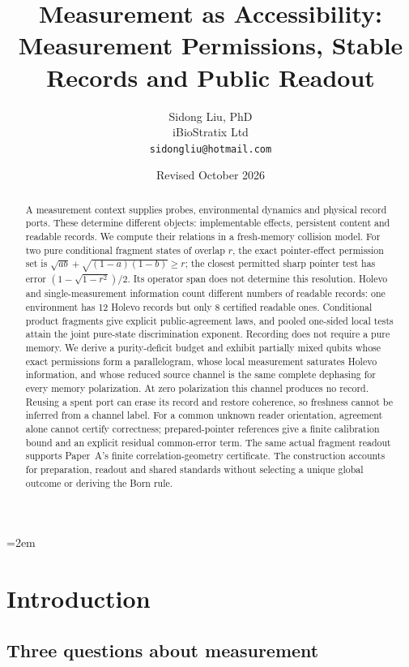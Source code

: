 \documentclass[12pt,a4paper]{article}
\title{Measurement as Accessibility:\\
Measurement Permissions, Stable Records and Public Readout}
\author{
  Sidong Liu, PhD \\
  iBioStratix Ltd \\
  \texttt{sidongliu@hotmail.com}
}
\date{Revised October 2026}
\begin{document}
\emergencystretch=2em
\raggedbottom
{}

\maketitle

\begin{abstract}
A measurement context supplies probes, environmental dynamics and physical record ports. These determine different objects: implementable effects, persistent content and readable records. We compute their relations in a fresh-memory collision model. For two pure conditional fragment states of overlap $r$, the exact pointer-effect permission set is $\sqrt{ab}+\sqrt{(1-a)(1-b)}\ge r$; the closest permitted sharp pointer test has error $(1-\sqrt{1-r^2})/2$. Its operator span does not determine this resolution. Holevo and single-measurement information count different numbers of readable records: one environment has 12 Holevo records but only 8 certified readable ones. Conditional product fragments give explicit public-agreement laws, and pooled one-sided local tests attain the joint pure-state discrimination exponent. Recording does not require a pure memory. We derive a purity-deficit budget and exhibit partially mixed qubits whose exact permissions form a parallelogram, whose local measurement saturates Holevo information, and whose reduced source channel is the same complete dephasing for every memory polarization. At zero polarization this channel produces no record. Reusing a spent port can erase its record and restore coherence, so freshness cannot be inferred from a channel label. For a common unknown reader orientation, agreement alone cannot certify correctness; prepared-pointer references give a finite calibration bound and an explicit residual common-error term. The same actual fragment readout supports Paper~A's finite correlation-geometry certificate. The construction accounts for preparation, readout and shared standards without selecting a unique global outcome or deriving the Born rule.
\end{abstract}

\section{Introduction}
\label{sec:intro}

\subsection{Three questions about measurement}
\end{document}
